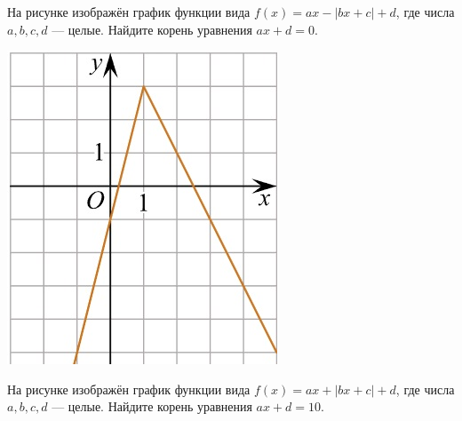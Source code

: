 \begin{class}[number=5]
\begin{listofex}
\begin{minipage}[c]{0.1\textwidth}
		\end{minipage}
		\item
		\begin{minipage}[t]{0.43\textwidth}
			На рисунке изображён график функции вида \(f(x)=ax-|bx+c|+d\), где числа \(a, b, c, d\) --- целые. Найдите корень уравнения \(ax+d=0\).
		\end{minipage}
		\begin{minipage}[c]{0.11\textwidth}
			\includegraphics[align=t, width=\textwidth]{pics/G111M4C5-3.jpg}
		\end{minipage}
		\item
		\begin{minipage}[t]{0.43\textwidth}
			На рисунке изображён график функции вида \(f(x)=ax+|bx+c|+d\), где числа \(a, b, c, d\) --- целые. Найдите корень уравнения \(ax+d=10\).
		\end{minipage}
		\begin{minipage}[c]{0.1\textwidth}

\end{minipage}
\end{listofex}
\end{class}
